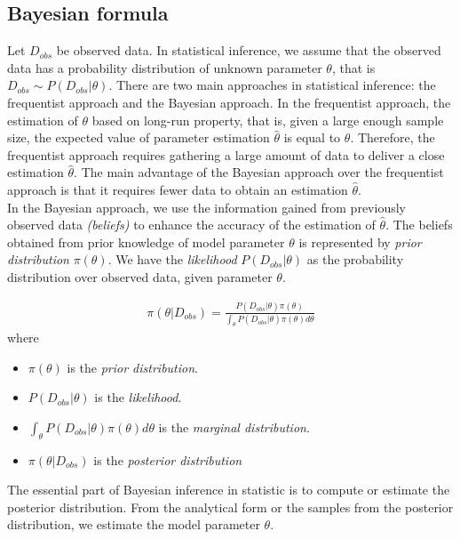 \subsection{Bayesian formula}
Let $D_{obs}$ be observed data. In statistical inference, we assume that the observed data has a
probability distribution of unknown parameter $\theta$, that is $D_{obs} \sim P(D_{obs}|\theta)$.
There are two main approaches in statistical inference: the frequentist approach and the Bayesian
approach. In the frequentist approach, the estimation of $\theta$ based on long-run property, that
is, given a large enough sample size, the expected value of parameter estimation $\hat{\theta}$ is
equal to $\theta$. Therefore, the frequentist approach requires gathering a large amount of data to
deliver a close estimation $\hat{\theta}$.  The main advantage of the Bayesian approach over the
frequentist approach is that it requires fewer data to obtain an estimation $\hat{\theta}$.\\
In the Bayesian approach, we use the information gained from previously observed data \textit{(beliefs)}
to enhance the accuracy of the estimation of $\hat{\theta}$. The beliefs obtained from prior
knowledge of model parameter $\theta$ is represented by \textit{prior distribution} $\pi(\theta)$.
We have the \textit{likelihood} $P(D_{obs}|\theta)$ as the probability distribution over observed
data, given parameter $\theta$.
\begin{definition}
    \rm
    \begin{align*}
        \pi(\theta | D_{obs}) = \frac{P(D_{obs}|\theta)\pi(\theta)}{\int_\theta P(D_{obs}|\theta)\pi(\theta)d\theta}
    \end{align*}
    where
    \begin{itemize}
        \item $\pi(\theta)$ is the \textit{prior distribution}.
        \item $P(D_{obs}|\theta)$ is the \textit{likelihood}.
        \item $\int_\theta P(D_{obs}|\theta)\pi(\theta)d\theta$ is the \textit{marginal distribution}.
        \item $\pi(\theta | D_{obs})$ is the \textit{posterior distribution}
    \end{itemize}
\end{definition}
The essential part of Bayesian inference in statistic is to compute or estimate the posterior
distribution. From the analytical form or the samples from the posterior distribution, we estimate
the model parameter $\theta$.

